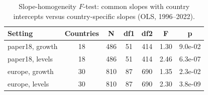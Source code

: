 \begin{table}[htbp]
\centering
\caption{Slope-homogeneity $F$-test: common slopes with country intercepts versus country-specific slopes (OLS, 1996--2022).}
\label{tab:slope_tests}
\begin{tabular}{lcccccc}
\toprule
Setting & Countries & N & df1 & df2 & F & p \\
\midrule
paper18, growth & 18 & 486 & 51 & 414 & 1.30 & 9.0e-02 \\
paper18, levels & 18 & 486 & 51 & 414 & 2.46 & 6.3e-07 \\
europe, growth & 30 & 810 & 87 & 690 & 1.35 & 2.3e-02 \\
europe, levels & 30 & 810 & 87 & 690 & 2.30 & 3.8e-09 \\
\bottomrule
\end{tabular}
\end{table}
